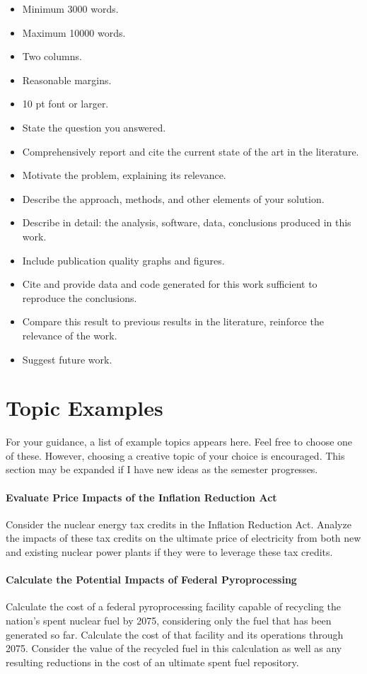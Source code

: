 \documentclass[12pts, answers]{exam}
\begin{document}
\begin{questions}
\begin{itemize}
\item Minimum 3000 words.
\item Maximum 10000 words.
\item Two columns.
\item Reasonable margins.
\item 10 pt font or larger.
\item State the question you answered.
\item Comprehensively report and cite the current state of the art in the literature.
\item Motivate the problem, explaining its relevance.
\item Describe the approach, methods, and other elements of your solution.
\item Describe in detail: the analysis, software, data, conclusions produced in this work.
\item Include publication quality graphs and figures.
\item Cite and provide data and code generated for this work sufficient to reproduce the conclusions.
\item Compare this result to previous results in the literature, reinforce the relevance of the work.
\item Suggest future work.
\end{itemize}

\end{questions}


\section*{Topic Examples}
For your guidance, a list of example topics appears here.
Feel free to choose one of these.  However, choosing a creative topic
of your choice is encouraged. This section may be expanded if I have new ideas
as the semester progresses.

\paragraph{Evaluate Price Impacts of the Inflation Reduction Act}
Consider the nuclear energy tax credits in the Inflation Reduction Act. 
Analyze the impacts of these tax credits on the ultimate price of electricity 
from both new and existing nuclear power plants if they were to leverage these tax credits. 

\paragraph{Calculate the Potential Impacts of Federal Pyroprocessing}
Calculate the cost of a federal pyroprocessing facility capable of recycling 
the nation's spent nuclear fuel by 2075, considering only the fuel that has been 
generated so far. Calculate the cost of that facility and its operations 
through 2075. Consider the value of the recycled fuel in this calculation as 
well as any resulting reductions in the cost of an ultimate spent fuel repository.
\end{document}
